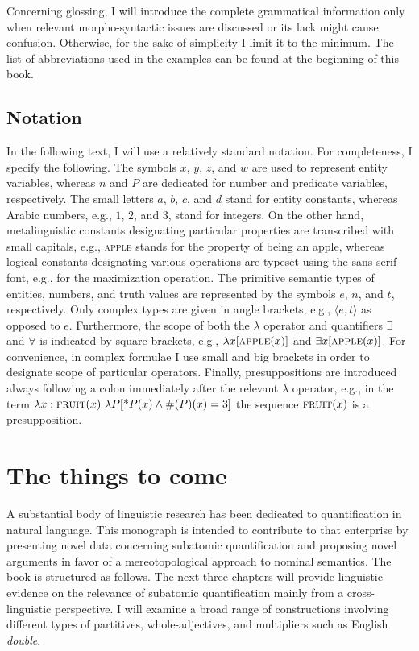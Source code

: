 Concerning glossing, I will introduce the complete grammatical information only when relevant morpho-syntactic issues are discussed or its lack might cause confusion. Otherwise, for the sake of simplicity I limit it to the minimum. The list of abbreviations used in the examples can be found at the beginning of this book. 

\subsection{Notation}\label{sec:notation}

In the following text, I will use a relatively standard notation. For completeness, I specify the following. The symbols $x$, $y$, $z$, and $w$ are used to represent entity variables, whereas $n$ and $P$ are dedicated for number and predicate variables, respectively. The small letters $a$, $b$, $c$, and $d$ stand for entity constants, whereas Arabic numbers, e.g., $1$, $2$, and $3$, stand for integers. On the other hand, metalinguistic constants designating particular properties are transcribed with small capitals, e.g., \textsc{apple} stands for the property of being an apple, whereas logical constants designating various operations are typeset using the sans-serif font, e.g.,  for the maximization operation. The primitive semantic types of entities, numbers, and truth values are represented by the symbols $e$, $n$, and $t$, respectively. Only complex types are given in angle brackets, e.g., $\langle e,t\rangle$ as opposed to $e$. Furthermore, the scope of both the $\lambda$ operator and quantifiers $\exists$ and $\forall$ is indicated by square brackets, e.g., $\lambda x[\textsc{apple}(x)]$ and $\exists x[\textsc{apple}(x)]$. For convenience, in complex formulae I use small and big brackets in order to designate scope of particular operators. Finally, presuppositions are introduced always following a colon immediately after the relevant $\lambda$ operator, e.g., in the term $\lambda x:\textsc{fruit}(x)\ \lambda P[\text{*}P(x) \wedge \#(P)(x) = 3]$ the sequence $\textsc{fruit}(x)$ is a presupposition. 

\section{The things to come}\label{sec:the-things-to-come}

A substantial body of linguistic research has been dedicated to quantification in natural language. This monograph is intended to contribute to that enterprise by presenting novel data concerning subatomic quantification and proposing novel arguments in favor of a mereotopological approach to nominal semantics. The book is structured as follows. The next three chapters will provide linguistic evidence on the relevance of subatomic quantification mainly from a cross-linguistic perspective. I will examine a broad range of constructions involving different types of partitives, whole-adjectives, and multipliers such as English \textit{double}. 

